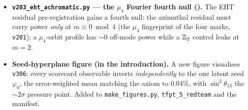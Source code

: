 \begin{itemize}
  split is made an explicit anti-numerology firewall rule: $\phi=2\cos(\pi/5)\in\mathbb Q(\sqrt5)$ is the
  \emph{static} carrier ($\Z/5$) field, every \emph{dynamic} rate is rational ($\mathbb Q$, the $\Z/6$ hand), so a
  dynamic rate explained by $\phi$ is a cross-field false friend (\texttt{v314}/\texttt{v315}).
\item \textbf{\texttt{v203\_eht\_achromatic.py} --- the $\mu_4$ Fourier fourth null (\mX).} The EHT residual
  pre-registration gains a fourth null: the azimuthal residual must carry power \emph{only} at $m\equiv0\bmod4$
  (the $\mu_4$ fingerprint of the four marks, \texttt{v201}); a $\mu_4$-orbit profile has $\sim0$ off-mode power
  while a $\mathbb{Z}_2$ control leaks at $m=2$.
\item \textbf{Seed-hyperplane figure (in the introduction).} A new figure visualises \texttt{v306}:
  every scorecard observable inverts \emph{independently} to the one latent seed $\varphi_0$, the error-weighted
  mean matching the axiom to $0.04\%$, with $\sin^2\theta_{13}$ the $\sim2\sigma$ pressure point. Added to
  \texttt{make\_figures.py}, \texttt{tfpt\_5\_redteam} and the manifest.
\end{itemize}

